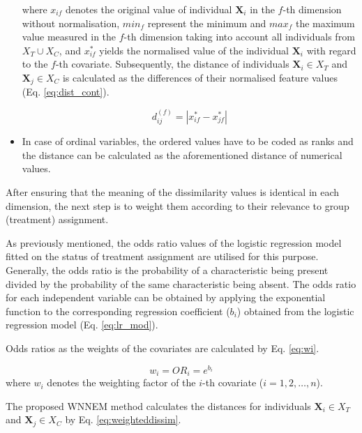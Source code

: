 \begin{itemize}
			      \noindent where $x_{if}$ denotes the original value of individual $\textbf{X}_i$ in the $f$-th dimension without normalisation, $min_f$ represent the minimum and $max_f$ the maximum value measured in the $f$-th dimension taking into account all individuals from ${X_T \cup X_C}$, and $x^{*}_{if}$ yields the normalised value of the individual $\textbf{X}_i$ with regard to the $f$-th covariate. Subsequently, the distance of individuals $\textbf{X}_i \in X_T$ and $\textbf{X}_j \in X_C$ is calculated as the differences of their normalised feature values (Eq. \ref{eq:dist_cont}). 
			      			                          
			      \begin{equation}
			      	\label{eq:dist_cont}
			      	d_{ij}^{(f)}=|x_{if}^*-x_{jf}^*|
			      \end{equation}
			      			      			      			      	      
			\item In case of ordinal variables, the ordered values have to be coded as ranks and the distance can be calculated as the aforementioned distance of numerical values. 
		\end{itemize}
								
		After ensuring that the meaning of the dissimilarity values is identical in each dimension, the next step is to weight them according to their relevance to group (treatment) assignment.
								
		As previously mentioned, the odds ratio values of the logistic regression model fitted on the status of treatment assignment are utilised for this purpose. Generally, the odds ratio is the probability of a characteristic being present divided by the probability of the same characteristic being absent. The odds ratio for each independent variable can be obtained by applying the exponential function to the corresponding regression coefficient ($ b_i $) obtained from the logistic regression model (Eq. \ref{eq:lr_mod}).
								
		Odds ratios as the weights of the covariates are calculated by Eq. \ref{eq:wi}.
								
		\begin{equation}
			\label{eq:wi}
			w_i=OR_i=e^{b_i}
		\end{equation}
		where $w_i$ denotes the weighting factor of the $i$-th covariate ($i=1, 2, \dots, n$).
								
		The proposed WNNEM method calculates the distances for individuals $\textbf{X}_i \in X_T$ and $\textbf{X}_j \in X_C$ by Eq. \ref{eq:weighteddissim}.
								
